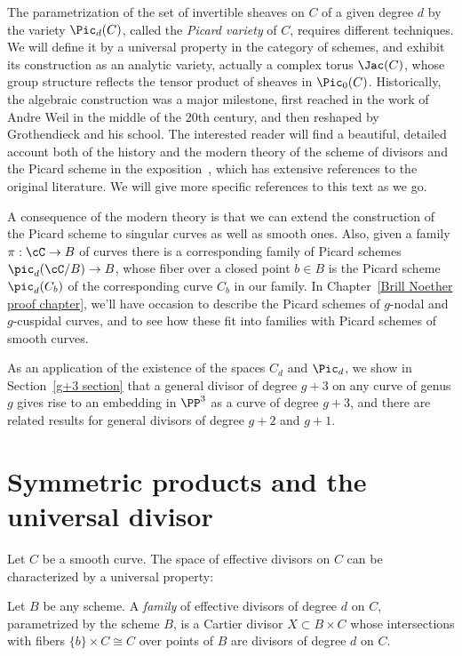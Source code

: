 The parametrization of the set of invertible sheaves on $C$ of a given degree $d$ by the variety $\Pic_d(C)$, called the \emph{Picard variety} of $C$, requires different techniques. We will define it by a universal property in the category of schemes, and exhibit its construction as an analytic variety, actually a complex torus $\Jac(C)$, whose group structure reflects the tensor product of
sheaves in $\Pic_0(C)$.
Historically, the algebraic construction was a major milestone, first reached in the work of Andre Weil in the middle of
the 20th century, and then reshaped by Grothendieck and his school. The interested reader will find a beautiful, detailed account both of the history and the 
modern theory of the scheme of divisors and the Picard scheme in the exposition~\cite{Kleiman-PicardScheme},
which has extensive references to the original literature. We will give
more specific references to this text as we go.

A consequence of the modern theory is that we can extend the construction of the Picard scheme to singular curves as well as smooth ones. Also, given a family $\pi : \cC \to B$ of curves there is a corresponding family of Picard schemes $\pic_d(\cC/B) \to B$, whose fiber over a closed point $b\in B$ is the Picard scheme $\pic_d(C_b)$ of the corresponding curve $C_b$ in our family.
In Chapter~\ref{Brill Noether proof chapter}, we'll have occasion to describe the Picard schemes of $g$-nodal and $g$-cuspidal curves, and to see how these fit into families with Picard schemes of smooth curves.

As an application of the existence of the spaces $C_d$ and $\Pic_d$, we show in Section~\ref{g+3 section} that a general divisor of degree $g+3$ on any curve of genus $g$ gives rise to an embedding in $\PP^3$ as a curve of degree $g+3$, and there are related results for general divisors of degree $g+2$ and $g+1$. 

\section{Symmetric products and the universal divisor}\label{symmetric section}

Let $C$ be a smooth curve. The space of effective divisors on $C$ can be characterized by a universal property:

\begin{definition}
Let $B$ be any scheme. A \emph{family} of effective divisors of degree $d$ on $C$, parametrized by the scheme $B$, is a Cartier divisor $X\subset B\times C$ whose intersections with fibers $\{b\} \times C \cong C$ over points of $B$ are divisors of degree $d$ on $C$.
\end{definition}

